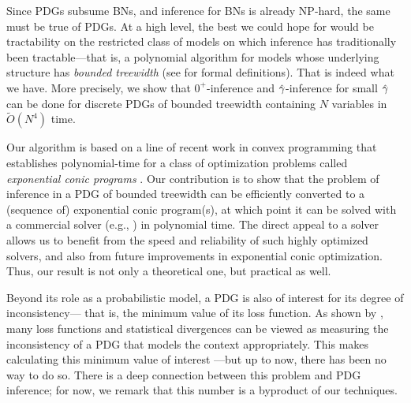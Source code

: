 Since PDGs subsume BNs, and inference for BNs is already NP-hard, the same must be true of PDGs.
At a high level, the best we could hope for would be tractability on the restricted
class of models on which inference has traditionally been tractable---that is, a polynomial algorithm for models whose
underlying structure has \emph{bounded treewidth} (see
 for formal definitions).
That is indeed what we have.  
More precisely, we show that
$0^+$\!-inference
and $\zogamma$-inference for small $\zogamma$ 
can be done 
for discrete PDGs of bounded treewidth containing $N$ variables in
$\tilde O(N^4)$ 
time.
 
Our algorithm
is based on a line of recent work in 
convex programming
that establishes
polynomial-time
for a class of optimization problems called \emph{exponential conic programs}
\parencite{badenbroek2021algorithm,skajaa2015homogeneous,nesterov1996infeasible}.
Our contribution is to show that the problem of inference in a PDG
of bounded treewidth
can be efficiently converted to a (sequence of) exponential conic program(s), at which point it can be solved with a commercial solver
(e.g., \textcite{mosek}) in polynomial time. 
The direct appeal to a solver allows us
to benefit from the speed and reliability of such highly optimized solvers, and also from future improvements in exponential conic optimization.
Thus, our result is not only a theoretical one, but practical as well.



Beyond its role as a probabilistic model,
a PDG is also of interest for its degree of inconsistency---%
that is, the minimum value of its loss function. 
As shown by 
\textcite{one-true-loss},
many loss functions and statistical divergences
can be viewed as measuring 
the inconsistency
of a PDG that models the context appropriately.
This makes calculating this minimum value of interest%
---but up to now, there has been no way to do so.
There is a deep connection between this problem and PDG inference;
for now, we remark that this number is a byproduct of our techniques.
    


\expandafter\discard{}



